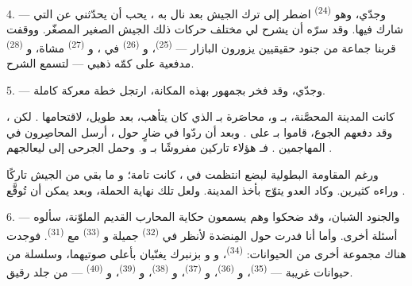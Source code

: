 \VUsaut{4.0mm}
\VUsaut{2.8mm}

4. --- وجدّي، وهو  \textsuperscript{(24)} اضطر إلى ترك الجيش
بعد  نال به ، يحب أن يحدّثني عن
 التي شارك فيها. وقد سرّه أن يشرح لي مختلف حركات ذلك
الجيش الصغير المصغّر. ووقفت قربنا جماعة من جنود حقيقيين يزورون البازار ---
 \textsuperscript{(25)}، و \textsuperscript{(26)}
في ، و \textsuperscript{(27)} مشاة،
و \textsuperscript{(28)} مدفعية على كمّه  ذهبي ---
لتسمع الشرح.

5. --- وجدّي، وقد فخر بجمهور بهذه المكانة، ارتجل خطة معركة كاملة.

كانت المدينة المحصَّنة، بـ و، محاصَرة
بـ الذي كان يتأهب، بعد  طويل، لاقتحامها
. لكن ، وقد دفعهم الجوع، قاموا
بـ على  . وبعد أن ردّوا
 في  ضارٍ حول ، أرسل المحاصِرون
  في  المهاجمين
. فـ هؤلاء تاركين 
مفروشًا بـ و. وحمل 
الجرحى إلى  ليعالجهم .

ورغم المقاومة البطولية لبضع  انتظمت في ، كانت
 تامة؛ و ما بقي من الجيش تاركًا وراءه
 كثيرين. وكاد العدو يتوّج  بأخذ المدينة. ولعل
تلك نهاية الحملة، وبعد  يمكن أن تُوقَّع .

\VUsaut{4.4mm}
\VUsaut{2.8mm}

6. --- والجنود الشبان، وقد ضحكوا وهم يسمعون حكاية المحارب القديم الملوّنة،
سألوه أسئلة أخرى. وأما أنا فدرت حول المِنضدة لأنظر في 
\textsuperscript{(32)} جميلة و \textsuperscript{(33)} مع 
\textsuperscript{(31)}. فوجدت هناك مجموعة أخرى من الحيوانات:
 \textsuperscript{(34)}، و و
بزنبرك يغنّيان بأعلى صوتيهما، وسلسلة من حيوانات غريبة ---
 \textsuperscript{(35)}، و \textsuperscript{(36)}،
و \textsuperscript{(37)}، و \textsuperscript{(38)}،
و \textsuperscript{(39)}، و \textsuperscript{(40)} --- من
جلد رقيق.

